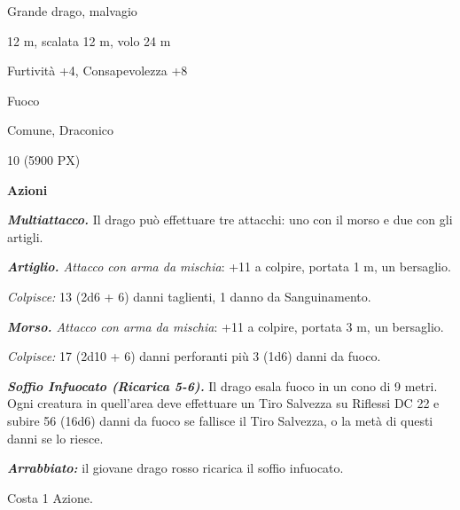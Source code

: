 \begin{multicols}{2}
{
\begin{description}[noitemsep, topsep=0pt, parsep=0pt, partopsep=0pt, itemsep=1pt, leftmargin=2.35cm,  labelwidth=2.2cm, itemindent=0cm, listparindent=0pt] %
\setlength{\baselineskip}{10pt}
\item[\textbf{Taglia/Tipo}] Grande drago, malvagio
\item[\textbf{Caratt.}] 
\item[\textbf{Punti Ferita}] 
\item[\textbf{Movimento}] 12 m, scalata 12 m, volo 24 m
\item[\textbf{Tiri Salvez.}] 
\item[\textbf{Comp.}] Furtività +4, Consapevolezza +8
\item[\textbf{Imm. Danni}] Fuoco
\item[\textbf{Sensi}] 
\item[\textbf{Linguaggi}] Comune, Draconico
\item[\textbf{Sfida}] 10 (5900 PX)
\end{description}
\smallskip

\textbf{Azioni}

\emph{\textbf{Multiattacco.}} Il drago può effettuare tre attacchi: uno con il morso e due con gli artigli.

\emph{\textbf{Artiglio.} Attacco con arma da mischia}: +11 a colpire, portata 1 m, un bersaglio.

\emph{Colpisce:} 13 (2d6 + 6) danni taglienti, 1 danno da Sanguinamento.

\emph{\textbf{Morso.} Attacco con arma da mischia}: +11 a colpire, portata 3 m, un bersaglio.

\emph{Colpisce:} 17 (2d10 + 6) danni perforanti più 3 (1d6) danni da fuoco.

\emph{\textbf{Soffio Infuocato (Ricarica 5-6).}} Il drago esala fuoco in un cono di 9 metri. Ogni creatura in quell'area deve effettuare un Tiro Salvezza su Riflessi DC 22 e subire 56 (16d6) danni da fuoco se fallisce il Tiro Salvezza, o la metà di questi danni se lo riesce.

\emph{\textbf{Arrabbiato:}} il giovane drago rosso ricarica il soffio infuocato.

Costa 1 Azione.

}
\end{multicols}
